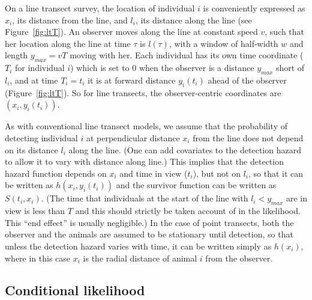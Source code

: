 \documentclass[useAMS,usenatbib,referee]{biom}
\begin{document}
On a line transect survey, the location of individual $i$ is conveniently expressed as $x_i$, its distance from the line, and $l_i$, its distance along the line (see Figure~\ref{fig:ltT}). An observer moves along the line at constant speed $v$, such that her location along the line at time $\tau$ is $l(\tau)$, with a window of half-width $w$ and length $y_{max}=vT$ moving with her. Each individual has its own time coordinate ($T_i$ for individual $i$) which is set to 0 when the observer is a distance $y_{max}$ short of $l_i$, and at time $T_i=t_i$ it is at forward distance $y_i(t_i)$ ahead of the observer (Figure~\ref{fig:ltT}). So for line transects, the observer-centric coordinates are $(x_i,y_i(t_i))$.

As with conventional line transect models, we assume that the probability of detecting individual $i$ at perpendicular distance $x_i$ from the line does not depend on its distance $l_i$ along the line. (One can add covariates to the detection hazard to allow it to vary with distance along line.) This implies that the detection hazard function depends on $x_i$ and time in view ($t_i$), but not on $l_i$, so that it can be written as $h(x_i,y_i(t_i))$ and the survivor function can be written as $S(t_i,x_i)$. (The time that individuals at the start of the line with $l_i<y_{max}$ are in view is less than $T$ and this should strictly be taken account of in the likelihood. This ``end effect'' is usually negligible.) In the case of point transects, both the observer and the animals are assumed to be stationary until detection, so that unless the detection hazard varies with time, it can be written simply as $h(x_i)$, where in this case $x_i$ is the radial distance of animal $i$ from the observer.
%
%
%

\subsection{Conditional likelihood}
\end{document}
